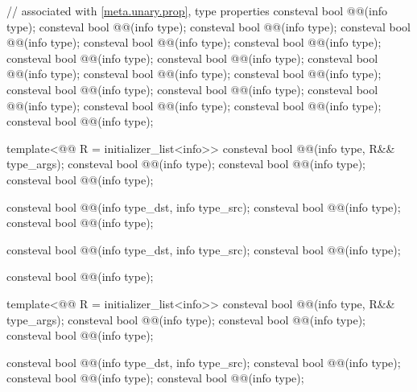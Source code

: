 \begin{codeblock}
// associated with \ref{meta.unary.prop}, type properties
consteval bool @@(info type);
consteval bool @@(info type);
consteval bool @@(info type);
consteval bool @@(info type);
consteval bool @@(info type);
consteval bool @@(info type);
consteval bool @@(info type);
consteval bool @@(info type);
consteval bool @@(info type);
consteval bool @@(info type);
consteval bool @@(info type);
consteval bool @@(info type);
consteval bool @@(info type);
consteval bool @@(info type);
consteval bool @@(info type);
consteval bool @@(info type);
consteval bool @@(info type);

template<@@ R = initializer_list<info>>
  consteval bool @@(info type, R&& type_args);
consteval bool @@(info type);
consteval bool @@(info type);
consteval bool @@(info type);

consteval bool @@(info type_dst, info type_src);
consteval bool @@(info type);
consteval bool @@(info type);

consteval bool @@(info type_dst, info type_src);
consteval bool @@(info type);

consteval bool @@(info type);

template<@@ R = initializer_list<info>>
  consteval bool @@(info type, R&& type_args);
consteval bool @@(info type);
consteval bool @@(info type);
consteval bool @@(info type);

consteval bool @@(info type_dst, info type_src);
consteval bool @@(info type);
consteval bool @@(info type);
consteval bool @@(info type);


\end{codeblock}
